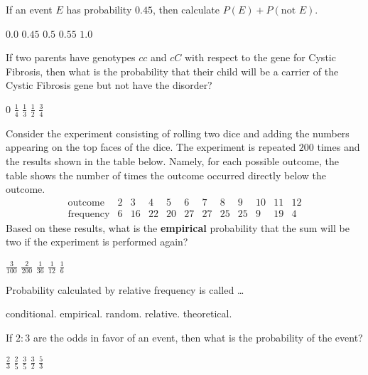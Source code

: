 \documentclass[answers,12pt]{exam}
\begin{document}
\begin{questions}
\question If an event $E$ has probability $0.45$,
then calculate $P\left(E\right)+P\left(\text{not $E$}\right)$.\\
\begin{oneparchoices}
\choice $0.0$
\choice $0.45$
\choice $0.5$
\choice $0.55$
\correctchoice $1.0$
\end{oneparchoices}

\question If two parents have genotypes $cc$ and $cC$
with respect to the gene for Cystic Fibrosis, then what
is the probability that their child will be
a carrier of the Cystic Fibrosis gene but not have the disorder?\\
\begin{oneparchoices}
\choice $0$
\choice $\frac{1}{4}$
\choice $\frac{1}{3}$
\correctchoice $\frac{1}{2}$
\choice $\frac{3}{4}$
\end{oneparchoices}

\question Consider the experiment consisting
of rolling two dice and adding the numbers
appearing on the top faces of the dice.
The experiment is repeated $200$ times and the
results shown in the table below. Namely, 
for each possible outcome, the table shows the number
of times the outcome occurred directly below the outcome.
\[\begin{array}{r|ccccccccccc}
\text{outcome}&2&3&4&5&6&7&8&9&10&11&12\\\hline
\text{frequency}&6&16&22&20&27&27&25&25&9&19&4
\end{array}\]
Based on these results, what is the {\bf empirical} probability
that the sum will be two if the experiment is performed again?\\
\begin{oneparchoices}
\correctchoice $\frac{3}{100}$
\choice $\frac{2}{200}$
\choice $\frac{1}{36}$
\choice $\frac{1}{12}$
\choice $\frac{1}{6}$
\end{oneparchoices}

\question Probability calculated by relative frequency is called \dots\\
\begin{oneparchoices}
\choice conditional.
\correctchoice empirical.
\choice random.
\choice relative.
\choice theoretical.
\end{oneparchoices}

\question If $2:3$ are the odds in favor
of an event, then what is the probability of the event?\\
\begin{oneparchoices}
\choice $\frac{2}{3}$ %
\correctchoice $\frac{2}{5}$
\choice $\frac{3}{5}$ %
\choice $\frac{3}{2}$ %
\choice $\frac{5}{3}$ %
\end{oneparchoices}
\end{questions}
\end{document}
